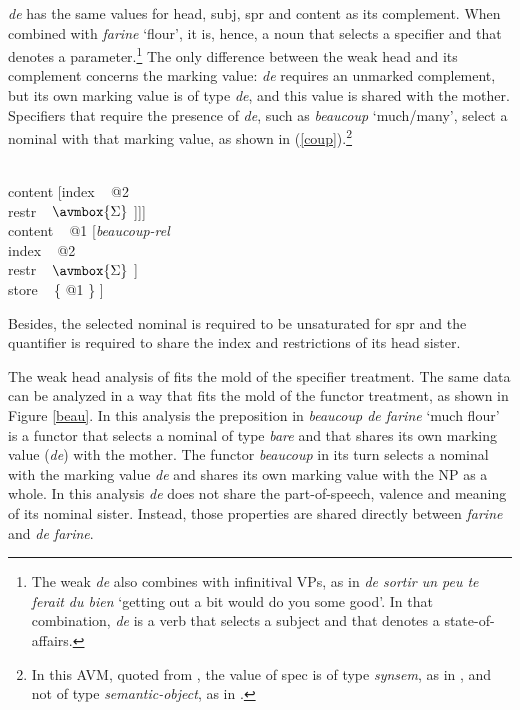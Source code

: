 \documentclass[output=paper]{langsci/langscibook}
\begin{document}
\noindent
{\it de\/} has the same values for {\sc head}, {\sc subj}, {\sc spr} and 
{\sc content} as its complement. 
When combined with {\it farine\/} `flour', it is, hence, a noun 
that selects a specifier and that denotes a parameter.\footnote{The 
weak {\it de\/} also combines with infinitival VPs, as in {\it de sortir un peu
te ferait du bien\/} `getting out a bit would do you some good'. In that 
combination, {\it de\/} is a verb that selects a subject and that denotes 
a state-of-affairs.} The only difference between the weak head and its complement  
concerns the {\sc marking} value: {\it de\/} requires an unmarked complement, but 
its own {\sc marking} value is of type {\it de}, and this value is shared with the mother.  
Specifiers that require the presence of {\it de}, such as {\it beaucoup\/} `much/many', 
select a nominal with that {\sc marking} value, 
as shown in (\ref{coup}).\footnote{In this AVM, quoted from \citet[18]{Abeilleetal04}, 
the value of {\sc spec} is of type {\it synsem}, as in \citet{PS94}, and not of type 
{\it semantic-object}, as in \citet{GS00}.}  

\begin{exe} 
\ex\label{coup} 
\begin{avm} 
[cat|head [{\it adverb\/}                                   \\
           spec|loc [cat [head ~ {\it noun\/}               \\
                          spr ~ <X>                         \\
                          mark ~ {\it de\/}]                \\
                     content [index ~ @2                    \\
                              restr ~ $\avmbox{\Sigma}$ ]]] \\ 
 content ~ @1 [{\it beaucoup-rel\/}        \\
               index ~ @2                  \\
               restr ~ $\avmbox{\Sigma}$ ] \\
 store ~ \{ @1 \} ]
\end{avm}
\end{exe} 

\noindent
Besides, the selected nominal is required to be unsaturated for {\sc spr} and 
the quantifier is required to share the index and restrictions of its head sister. 

The weak head analysis of \citet{Abeilleetal04} fits the mold of the specifier treatment. 
The same data can be analyzed in a way that fits the mold of the functor treatment,
as shown in Figure \ref{beau}. 
In this analysis the preposition in {\it beaucoup de farine\/} `much flour'
is a functor that selects a nominal of type {\it bare\/} and that 
shares its own {\sc marking} value ({\it de\/}) with the mother. 
The functor {\it beaucoup} in its turn selects a nominal with the {\sc marking} value 
{\it de\/} and shares its own {\sc marking} value with the NP as a whole. 
In this analysis {\it de\/} does not share the part-of-speech, valence and 
meaning of its nominal sister. Instead, those properties are shared directly between
{\it farine\/} and {\it de farine}. 
\end{document}
